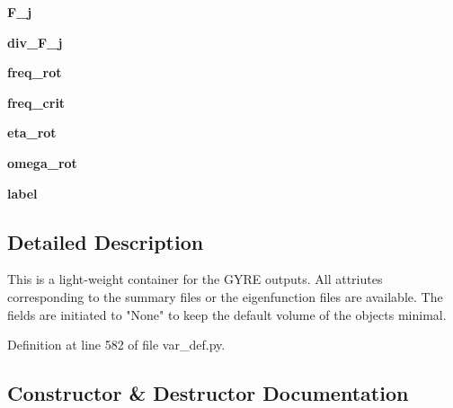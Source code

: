 \begin{DoxyCompactItemize}
{\bfseries F\+\_\+j}
\item 
\mbox{\label{classasamba_1_1var__def_1_1modes_a17b8a735886d4aaa988dcad54a4d7cdf}} 
{\bfseries div\+\_\+\+F\+\_\+j}
\item 
\mbox{\label{classasamba_1_1var__def_1_1modes_a632181ff0c8c224e89404a3d44a3f190}} 
{\bfseries freq\+\_\+rot}
\item 
\mbox{\label{classasamba_1_1var__def_1_1modes_addb3760a10df298392bca09f06aa8c1e}} 
{\bfseries freq\+\_\+crit}
\item 
\mbox{\label{classasamba_1_1var__def_1_1modes_a39e79bc979d3b545f6c4a98093d0c2bc}} 
{\bfseries eta\+\_\+rot}
\item 
\mbox{\label{classasamba_1_1var__def_1_1modes_acea37e3fc94676be4a39dc13fe306e0e}} 
{\bfseries omega\+\_\+rot}
\item 
\mbox{\label{classasamba_1_1var__def_1_1modes_acf54b56da47442b3ada6abcb7da78aa1}} 
{\bfseries label}
\end{DoxyCompactItemize}


\subsection{Detailed Description}
\begin{DoxyVerb}This is a light-weight container for the GYRE outputs. All attriutes corresponding to the summary
files or the eigenfunction files are available. The fields are initiated to "None" to keep the default
volume of the objects minimal.
\end{DoxyVerb}
 

Definition at line 582 of file var\+\_\+def.\+py.



\subsection{Constructor \& Destructor Documentation}
\mbox{\label{classasamba_1_1var__def_1_1modes_a3e7e2e2e01dadeb07002bde1f8e35ac9}} 
